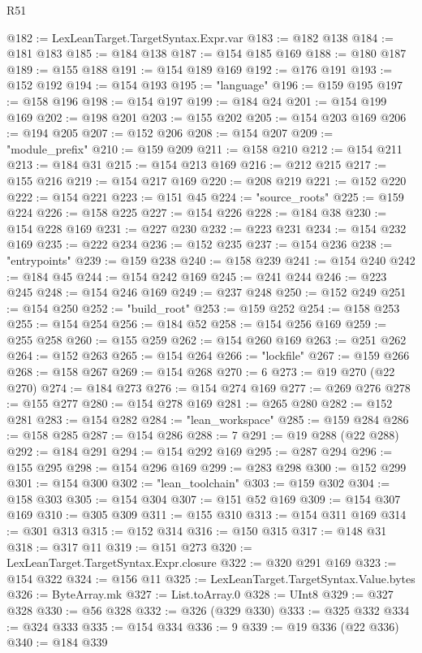 \begin{lexlean}{R51}
\begin{coremodule}
@182 := LexLeanTarget.TargetSyntax.Expr.var
@183 := @182 @138
@184 := @181 @183
@185 := @184 @138
@187 := @154 @185 @169
@188 := @180 @187
@189 := @155 @188
@191 := @154 @189 @169
@192 := @176 @191
@193 := @152 @192
@194 := @154 @193
@195 := "language"
@196 := @159 @195
@197 := @158 @196
@198 := @154 @197
@199 := @184 @24
@201 := @154 @199 @169
@202 := @198 @201
@203 := @155 @202
@205 := @154 @203 @169
@206 := @194 @205
@207 := @152 @206
@208 := @154 @207
@209 := "module_prefix"
@210 := @159 @209
@211 := @158 @210
@212 := @154 @211
@213 := @184 @31
@215 := @154 @213 @169
@216 := @212 @215
@217 := @155 @216
@219 := @154 @217 @169
@220 := @208 @219
@221 := @152 @220
@222 := @154 @221
@223 := @151 @45
@224 := "source_roots"
@225 := @159 @224
@226 := @158 @225
@227 := @154 @226
@228 := @184 @38
@230 := @154 @228 @169
@231 := @227 @230
@232 := @223 @231
@234 := @154 @232 @169
@235 := @222 @234
@236 := @152 @235
@237 := @154 @236
@238 := "entrypoints"
@239 := @159 @238
@240 := @158 @239
@241 := @154 @240
@242 := @184 @45
@244 := @154 @242 @169
@245 := @241 @244
@246 := @223 @245
@248 := @154 @246 @169
@249 := @237 @248
@250 := @152 @249
@251 := @154 @250
@252 := "build_root"
@253 := @159 @252
@254 := @158 @253
@255 := @154 @254
@256 := @184 @52
@258 := @154 @256 @169
@259 := @255 @258
@260 := @155 @259
@262 := @154 @260 @169
@263 := @251 @262
@264 := @152 @263
@265 := @154 @264
@266 := "lockfile"
@267 := @159 @266
@268 := @158 @267
@269 := @154 @268
@270 := 6
@273 := @19 @270 (@22 @270)
@274 := @184 @273
@276 := @154 @274 @169
@277 := @269 @276
@278 := @155 @277
@280 := @154 @278 @169
@281 := @265 @280
@282 := @152 @281
@283 := @154 @282
@284 := "lean_workspace"
@285 := @159 @284
@286 := @158 @285
@287 := @154 @286
@288 := 7
@291 := @19 @288 (@22 @288)
@292 := @184 @291
@294 := @154 @292 @169
@295 := @287 @294
@296 := @155 @295
@298 := @154 @296 @169
@299 := @283 @298
@300 := @152 @299
@301 := @154 @300
@302 := "lean_toolchain"
@303 := @159 @302
@304 := @158 @303
@305 := @154 @304
@307 := @151 @52 @169
@309 := @154 @307 @169
@310 := @305 @309
@311 := @155 @310
@313 := @154 @311 @169
@314 := @301 @313
@315 := @152 @314
@316 := @150 @315
@317 := @148 @31
@318 := @317 @11
@319 := @151 @273
@320 := LexLeanTarget.TargetSyntax.Expr.closure
@322 := @320 @291 @169
@323 := @154 @322
@324 := @156 @11
@325 := LexLeanTarget.TargetSyntax.Value.bytes
@326 := ByteArray.mk
@327 := List.toArray.{0}
@328 := UInt8
@329 := @327 @328
@330 := @56 @328
@332 := @326 (@329 @330)
@333 := @325 @332
@334 := @324 @333
@335 := @154 @334
@336 := 9
@339 := @19 @336 (@22 @336)
@340 := @184 @339

\end{coremodule}
\end{lexlean}
